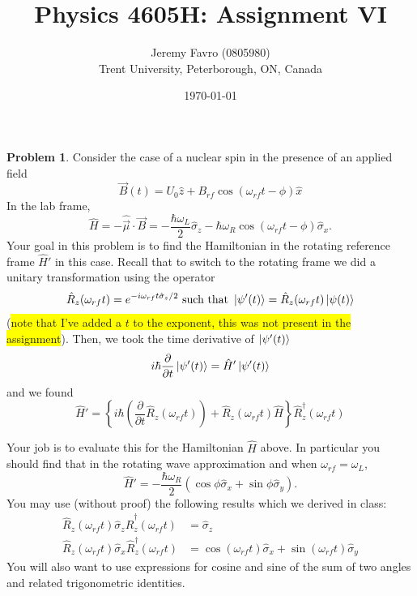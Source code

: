 \documentclass[10pt]{article}
\title{Physics 4605H: Assignment VI}
\author{Jeremy Favro (0805980) \\ Trent University, Peterborough, ON, Canada}
\date{\today}
\theoremstyle{definition}
\newtheorem{problem}{Problem}
\newcommand{\ux}{\hat{x}}
\newcommand{\uz}{\hat{z}}
\newcommand{\highlight}[1]{\colorbox{yellow}{#1}}
\newcommand{\bv}[1]{\vec{#1}}
\begin{document}
\maketitle

\begin{problem}
Consider the case of a nuclear spin in the presence of an applied field
$$\bv{B}(t)=U_0\uz+B_{rf}\cos\left(\omega_{rf}t-\phi\right)\ux$$
In the lab frame,
$$\hat{H}=-\hat{\bv{\mu}}\cdot\bv{B}=-\frac{\hbar \omega_L}{2}\hat{\sigma}_z-\hbar\omega_R\cos\left(\omega_{rf}t-\phi\right)\hat{\sigma}_x.$$
Your goal in this problem is to find the Hamiltonian in the rotating reference frame $\hat{H}'$ in
this case.
Recall that to switch to the rotating frame we did a unitary transformation using the operator
$$\hat{R}_z(\omega_{rf}t)=e^{-i\omega_{rf}t\hat{\sigma}_z/2}\text{ such that }\ket{\psi'(t)}=\hat{R}_z(\omega_{rf}t)\ket{\psi(t)}$$
(\highlight{note that I've added a $t$ to the exponent, this was not present in the assignment}).
Then, we took the time derivative of $\ket{\psi'(t)}$
$$i\hbar\frac{\partial}{\partial t}\ket{\psi'(t)}=\hat{H}'\ket{\psi'(t)}$$
and we found
$$\hat{H}'=\left\{i\hbar\left(\frac{\partial}{\partial t}\hat{R}_z(\omega_{rf}t)\right)+\hat{R}_z(\omega_{rf}t)\hat{H}\right\}\hat{R}^\dagger_z(\omega_{rf}t)$$

Your job is to evaluate this for the Hamiltonian $\hat{H}$ above. In particular you should find that
in the rotating wave approximation and when $\omega_{rf}=\omega_{L}$,
$$\hat{H}'=-\frac{\hbar\omega_R}{2}\left(\cos\phi\hat{\sigma}_x+\sin\phi \hat{\sigma}_y\right).$$
You may use (without proof) the following results which we derived in class:
\begin{align*}
  \hat{R}_z(\omega_{rf}t)\hat{\sigma}_z\hat{R}_z^\dagger(\omega_{rf}t) & =\hat{\sigma}_z                                                    \\
  \hat{R}_z(\omega_{rf}t)\hat{\sigma}_x\hat{R}_z^\dagger(\omega_{rf}t) & =\cos(\omega_{rf}t)\hat{\sigma}_x+\sin(\omega_{rf}t)\hat{\sigma}_y
\end{align*}
You will also want to use expressions for cosine and sine of the sum of two angles and related
trigonometric identities.
\end{problem}
\end{document}
